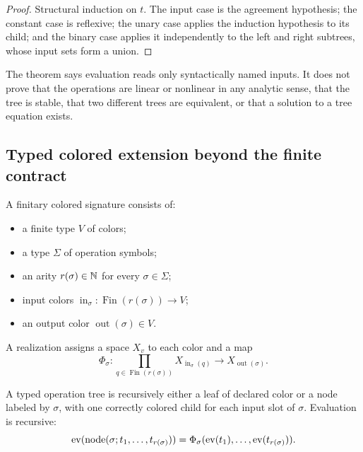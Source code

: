 \begin{proof}
Structural induction on $t$.  The input case is the agreement hypothesis;
the constant case is reflexive; the unary case applies the induction
hypothesis to its child; and the binary case applies it independently to the
left and right subtrees, whose input sets form a union.
\end{proof}

\begin{boundary}
The theorem says evaluation reads only syntactically named inputs.  It does
not prove that the operations are linear or nonlinear in any analytic sense,
that the tree is stable, that two different trees are equivalent, or that a
solution to a tree equation exists.
\end{boundary}

\subsection{Typed colored extension beyond the finite contract}

\begin{definition}
\label{def:signature}
A finitary colored signature consists of:
\begin{itemize}
\item a finite type $V$ of colors;
\item a type $\Sigma$ of operation symbols;
\item an arity $r(\sigma)\in\mathbb N$ for every $\sigma\in\Sigma$;
\item input colors
$\operatorname{in}_\sigma:\operatorname{Fin}(r(\sigma))\to V$;
\item an output color $\operatorname{out}(\sigma)\in V$.
\end{itemize}
A realization assigns a space $X_v$ to each color and a map
\[
\Phi_\sigma:
\prod_{q\in\operatorname{Fin}(r(\sigma))}X_{\operatorname{in}_\sigma(q)}
\longrightarrow X_{\operatorname{out}(\sigma)}.
\]
\end{definition}

\begin{definition}
\label{def:operation-tree}
A typed operation tree is recursively either a leaf of declared color or a
node labeled by $\sigma$, with one correctly colored child for each input
slot of $\sigma$.  Evaluation is recursive:
\[
\operatorname{ev}(\operatorname{node}(\sigma;t_1,\ldots,t_{r(\sigma)}))
=
\Phi_\sigma(\operatorname{ev}(t_1),\ldots,\operatorname{ev}(t_{r(\sigma)})).
\]
\end{definition}

